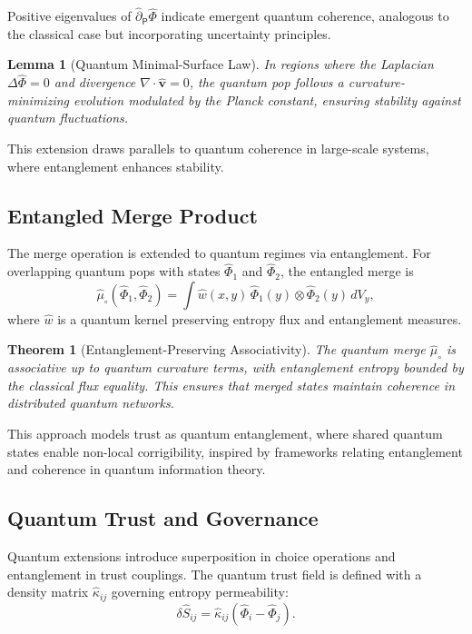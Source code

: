 \documentclass[12pt]{article}
\newtheorem{lemma}{Lemma}
\newtheorem{theorem}{Theorem}
\begin{document}
Positive eigenvalues of \(\hat{\partial}_{\mathsf{P}} \hat{\Phi}\) indicate emergent quantum coherence, analogous to the classical case but incorporating uncertainty principles.

\begin{lemma}[Quantum Minimal-Surface Law]
In regions where the Laplacian \(\Delta \hat{\Phi} = 0\) and divergence \(\nabla \cdot \hat{\mathbf{v}} = 0\), the quantum pop follows a curvature-minimizing evolution modulated by the Planck constant, ensuring stability against quantum fluctuations.
\end{lemma}

This extension draws parallels to quantum coherence in large-scale systems, where entanglement enhances stability.

\subsection{Entangled Merge Product}
The merge operation is extended to quantum regimes via entanglement. For overlapping quantum pops with states \(\hat{\Phi}_1\) and \(\hat{\Phi}_2\), the entangled merge is
\begin{equation}
\hat{\mu}_{\circ} (\hat{\Phi}_1, \hat{\Phi}_2) = \int \hat{w}(x,y) \, \hat{\Phi}_1(y) \otimes \hat{\Phi}_2(y) \, dV_y,
\end{equation}
where \(\hat{w}\) is a quantum kernel preserving entropy flux and entanglement measures.

\begin{theorem}[Entanglement-Preserving Associativity]
The quantum merge \(\hat{\mu}_{\circ}\) is associative up to quantum curvature terms, with entanglement entropy bounded by the classical flux equality. This ensures that merged states maintain coherence in distributed quantum networks.
\end{theorem}

This approach models trust as quantum entanglement, where shared quantum states enable non-local corrigibility, inspired by frameworks relating entanglement and coherence in quantum information theory.

\subsection{Quantum Trust and Governance}
Quantum extensions introduce superposition in choice operations and entanglement in trust couplings. The quantum trust field is defined with a density matrix \(\hat{\kappa}_{ij}\) governing entropy permeability:
\begin{equation}
\delta \hat{S}_{ij} = \hat{\kappa}_{ij} (\hat{\Phi}_i - \hat{\Phi}_j).
\end{equation}
\end{document}
